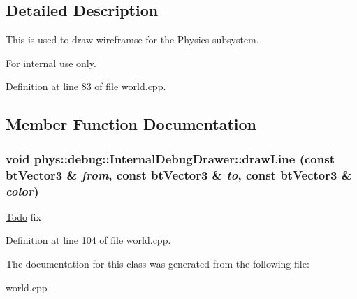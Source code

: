 \subsection{Detailed Description}
This is used to draw wireframse for the Physics subsystem. \begin{DoxyInternal}{For internal use only.}
\end{DoxyInternal}


Definition at line 83 of file world.cpp.



\subsection{Member Function Documentation}
\hypertarget{classphys_1_1debug_1_1InternalDebugDrawer_a8a35c3c80fddaaec8e21f737ed1b3938}{
\subsubsection[{drawLine}]{\setlength{\rightskip}{0pt plus 5cm}void phys::debug::InternalDebugDrawer::drawLine (const btVector3 \& {\em from}, \/  const btVector3 \& {\em to}, \/  const btVector3 \& {\em color})}}
\label{db/d27/classphys_1_1debug_1_1InternalDebugDrawer_a8a35c3c80fddaaec8e21f737ed1b3938}


\begin{Desc}
\item[\hyperlink{todo__todo000020}{Todo}]fix \end{Desc}




Definition at line 104 of file world.cpp.



The documentation for this class was generated from the following file:\begin{DoxyCompactItemize}
\item 
world.cpp\end{DoxyCompactItemize}
